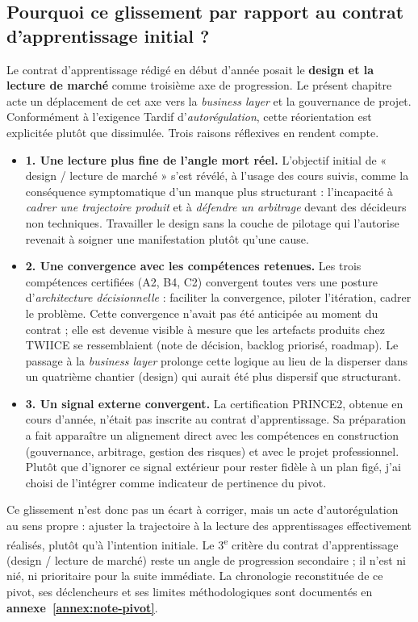\subsection*{Pourquoi ce glissement par rapport au contrat d'apprentissage initial ?}

Le contrat d'apprentissage rédigé en début d'année posait le \textbf{design et la lecture de marché} comme troisième axe de progression. Le présent chapitre acte un déplacement de cet axe vers la \textit{business layer} et la gouvernance de projet. Conformément à l'exigence Tardif d'\emph{autorégulation}, cette réorientation est explicitée plutôt que dissimulée. Trois raisons réflexives en rendent compte.

\begin{itemize}
  \item \textbf{1. Une lecture plus fine de l'angle mort réel.} L'objectif initial de « design / lecture de marché » s'est révélé, à l'usage des cours suivis, comme la conséquence symptomatique d'un manque plus structurant : l'incapacité à \emph{cadrer une trajectoire produit} et à \emph{défendre un arbitrage} devant des décideurs non techniques. Travailler le design sans la couche de pilotage qui l'autorise revenait à soigner une manifestation plutôt qu'une cause.
  \item \textbf{2. Une convergence avec les compétences retenues.} Les trois compétences certifiées (A2, B4, C2) convergent toutes vers une posture d'\emph{architecture décisionnelle} : faciliter la convergence, piloter l'itération, cadrer le problème. Cette convergence n'avait pas été anticipée au moment du contrat ; elle est devenue visible à mesure que les artefacts produits chez TWIICE se ressemblaient (note de décision, backlog priorisé, roadmap). Le passage à la \textit{business layer} prolonge cette logique au lieu de la disperser dans un quatrième chantier (design) qui aurait été plus dispersif que structurant.
  \item \textbf{3. Un signal externe convergent.} La certification PRINCE2, obtenue en cours d'année, n'était pas inscrite au contrat d'apprentissage. Sa préparation a fait apparaître un alignement direct avec les compétences en construction (gouvernance, arbitrage, gestion des risques) et avec le projet professionnel. Plutôt que d'ignorer ce signal extérieur pour rester fidèle à un plan figé, j'ai choisi de l'intégrer comme indicateur de pertinence du pivot.
\end{itemize}

Ce glissement n'est donc pas un écart à corriger, mais un acte d'autorégulation au sens propre : ajuster la trajectoire à la lecture des apprentissages effectivement réalisés, plutôt qu'à l'intention initiale. Le 3\textsuperscript{e} critère du contrat d'apprentissage (design / lecture de marché) reste un angle de progression secondaire ; il n'est ni nié, ni prioritaire pour la suite immédiate. La chronologie reconstituée de ce pivot, ses déclencheurs et ses limites méthodologiques sont documentés en \textbf{annexe~\ref{annex:note-pivot}}.

